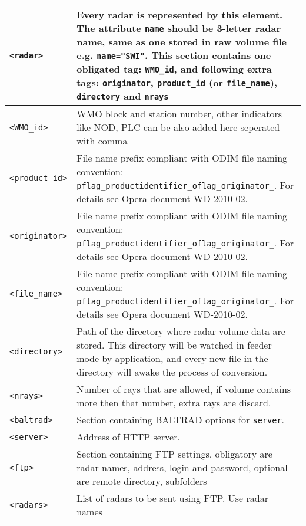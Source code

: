\documentclass[11p]{article}
\begin{document}
\begin{longtable}{|l|p{9cm}|}

\hline

\texttt{<radar>}&Every radar is represented by this element. The attribute
\texttt{name} should be 3-letter radar name, same as one stored in raw volume
file e.g. \texttt{name="SWI"}. This section contains one obligated tag:
\texttt{WMO\_id}, and following extra tags: \texttt{originator}, \texttt{product\_id} (or \texttt{file\_name}),
\texttt{directory} and \texttt{nrays}\\ \hline 
\texttt{<WMO\_id>}& WMO block and station number, other indicators like NOD,
PLC can be also added here seperated with comma\\
\hline \texttt{<product\_id>}&File name prefix compliant with ODIM file naming
convention: \texttt{pflag\_productidentifier\_oflag\_originator\_}. For details
see Opera document WD-2010-02. \\ \hline
\texttt{<originator>}&File name prefix compliant with ODIM file naming
convention: \texttt{pflag\_productidentifier\_oflag\_originator\_}. For details
see Opera document WD-2010-02. \\ \hline
\texttt{<file\_name>}&File name prefix compliant with ODIM file naming
convention: \texttt{pflag\_productidentifier\_oflag\_originator\_}. For details
see Opera document WD-2010-02. \\ \hline
\texttt{<directory>}& Path of the directory where radar volume data are stored.
This directory will be watched in feeder mode by application, and every new
file in the directory will awake the process of conversion. \\ \hline
\texttt{<nrays>}&Number of rays that are allowed, if volume contains more then
that number, extra rays are discard. \\ \hline \hline
\texttt{<baltrad>}& Section containing BALTRAD options for
\texttt{server}. \\ \hline \texttt{<server>}& Address of HTTP server.\\ \hline
\hline
\texttt{<ftp>}& Section containing FTP settings, obligatory are radar names,
address, login and password, optional are remote directory, subfolders\\
\hline \texttt{<radars>}& List of radars to be sent using FTP. Use radar names 

\end{longtable}
\end{document}
